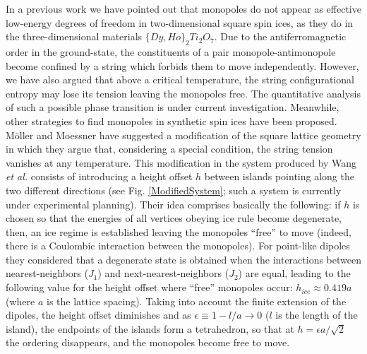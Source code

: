 \documentclass[aps,prb,twocolumn,floatfix,showpacs,amsmath,amssymb]{revtex4}
\begin{document}
In a previous work \cite{Mol09} we have pointed out that monopoles
do not appear as effective low-energy degrees of freedom in
two-dimensional square spin ices, as they do in the
three-dimensional materials $\{Dy,Ho\}_{2}Ti_{2}O_{7}$. Due to the
antiferromagnetic order in the ground-state, the constituents of a
pair monopole-antimonopole become confined by a string which
forbids them to move independently. However, we have also argued
that above a critical temperature, the string configurational
entropy may lose its tension leaving the monopoles free. The
quantitative analysis of such a possible phase transition is under
current investigation\cite{workinprogress}. Meanwhile, other
strategies to find monopoles in synthetic spin ices have been
proposed. M\"{o}ller and Moessner \cite{Moller09} have suggested a
modification of the square lattice geometry in which they argue
that, considering a special condition, the string tension vanishes
at any temperature. This modification in the system produced by
Wang \emph{et al.}\cite{Wang06} consists of introducing a height
offset $h$ between islands pointing along the two different
directions \cite{Moller06,Moller09} (see Fig.
\ref{ModifiedSystem}; such a system is currently under
experimental planning\cite{Schiffer-priv-comm}). Their idea
comprises basically the following: if $h$ is chosen so that the
energies of all vertices obeying ice rule become degenerate, then,
an ice regime is established leaving the monopoles ``free'' to
move (indeed, there is a Coulombic interaction between the
monopoles)\cite{Moller09}. For point-like dipoles they considered
that a degenerate state is obtained when the interactions between
nearest-neighbors ($J_1$) and next-nearest-neighbors ($J_2$) are
equal, leading to the following value for the height offset where
``free'' monopoles occur: $h_{ice}\approx 0.419 a$ (where $a$ is
the lattice spacing)\cite{Moller06}. Taking into account the
finite extension of the dipoles, the height offset diminishes and
as $\epsilon \equiv 1-l/a \rightarrow 0$ ($l$ is the length of the
island), the endpoints of the islands form a tetrahedron, so that
at $h= \epsilon a/ \sqrt{2}$ the ordering disappears, and the
monopoles become free to move\cite{Moller09}.
\end{document}
